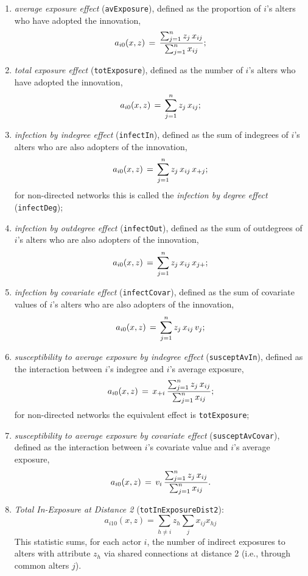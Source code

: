 \documentclass[a4paper,fleqn,11pt]{article}
\newcommand{\+}{\, + \,}
\newcommand{\vit}{\theenumi}
\begin{document}
\begin{enumerate}
 For models including these effects, it is recommended to use
 an algorithm that leads to smaller step sizes, i.e.,
 with a value for \texttt{firstg} lower than the default of 0.2.

\item \emph{average exposure effect} (\verb|avExposure|),
  defined as the proportion of $i$'s alters who have adopted the innovation,
\[
a_{i\vit}(x, z) \, = \, \frac{\sum_{j=1}^n z_j\, x_{ij} }{\sum_{j=1}^n x_{ij}};
\]

\item \emph{total exposure effect} (\verb|totExposure|), defined as the
 number of $i$'s alters who have adopted the innovation,
\[
a_{i\vit}(x, z) \,=\, \sum_{j=1}^n z_j\, x_{ij} ;
\]
\item \emph{infection by indegree effect} (\verb|infectIn|),
  defined as the sum of indegrees of $i$'s alters who are also adopters of the innovation,
\[
a_{i\vit}(x, z) \, =\, \sum_{j=1}^n z_j \,x_{ij}\, x_{+j};
\]
  for non-directed networks this is called the
   \emph{infection by degree effect} (\verb|infectDeg|);
\item \emph{infection by outdegree effect} (\verb|infectOut|),
 defined as the sum of outdegrees of $i$'s alters who are also adopters of the innovation,
\[
a_{i\vit}(x, z)\, = \, \sum_{j=1}^n z_j\, x_{ij}\, x_{j+};
\]
\item \emph{infection by covariate effect} (\verb|infectCovar|),
 defined as the sum of covariate values of $i$'s alters who are also adopters of the innovation,
\[
a_{i\vit}(x, z)\, =\, \sum_{j=1}^n z_j\, x_{ij}\, v_j;
\]
\item \emph{susceptibility to average exposure by indegree effect}
 (\verb|susceptAvIn|),
 defined as the interaction between $i$'s indegree and $i$'s average exposure,
\[
a_{i\vit}(x, z)\, = \,x_{+i} \, \frac{\sum_{j=1}^n z_j\, x_{ij}}{\sum_{j=1}^n x_{ij}};
\]
  for non-directed networks the equivalent effect is \verb|totExposure|;

\item \emph{susceptibility to average exposure by covariate effect}
 (\verb|susceptAvCovar|),
  defined as the interaction between $i$'s covariate value and $i$'s  average exposure,
\[
a_{i\vit}(x, z) \, = \, v_{i} \, \frac{\sum_{j=1}^n z_j\, x_{ij}}{\sum_{j=1}^n x_{ij}}.
\]

\item \emph{Total In-Exposure at Distance 2} (\verb|totInExposureDist2|):
    \[
        a_{i10}(x, z) =  \sum_{h \neq i} z_h \sum_{j} x_{ij} x_{hj}
    \]
    This statistic sums, for each actor $i$, the number of indirect exposures to
    alters with attribute $z_h$ via shared connections at distance 2
    (i.e., through common alters $j$).


\end{enumerate}
\end{document}
